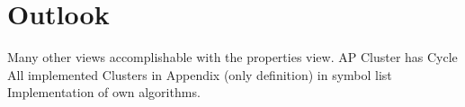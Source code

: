 \documentclass[preview]{standalone}
\begin{document}
\section{Outlook}
Many other views accomplishable with the properties view.
AP Cluster has Cycle
All implemented Clusters in Appendix (only definition)
\intmodn {} \natnums in symbol list
Implementation of own algorithms.
\end{document}
